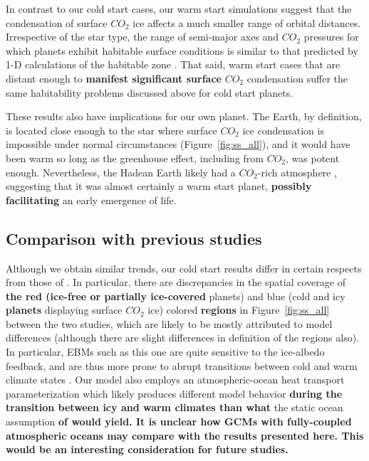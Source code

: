 \documentclass[fleqn,usenatbib]{mnras}
\providecommand{\DIFadd}[1]{{\bf #1}} %
\providecommand{\DIFdel}[1]{} %
\providecommand{\DIFaddbegin}{} %
\providecommand{\DIFaddend}{} %
\providecommand{\DIFdelbegin}{} %
\providecommand{\DIFdelend}{} %
\newcommand{\DIFscaledelfig}{0.5}
\newlength{\DIFdelgraphicswidth} %
\newlength{\DIFdelgraphicsheight} %
\newcommand{\DIFaddincludegraphics}[2][]{{\color{blue}\fbox{\DIFOincludegraphics[#1]{#2}}}} %
\newcommand{\DIFdelincludegraphics}[2][]{%
\sbox{\DIFdelgraphicsbox}{\DIFOincludegraphics[#1]{#2}}%
\settoboxwidth{\DIFdelgraphicswidth}{\DIFdelgraphicsbox} %
\settoboxtotalheight{\DIFdelgraphicsheight}{\DIFdelgraphicsbox} %
\scalebox{\DIFscaledelfig}{%
\parbox[b]{\DIFdelgraphicswidth}{\usebox{\DIFdelgraphicsbox}\\[-\baselineskip] \rule{\DIFdelgraphicswidth}{0em}}\llap{\resizebox{\DIFdelgraphicswidth}{\DIFdelgraphicsheight}{%
\setlength{\unitlength}{\DIFdelgraphicswidth}%
\begin{picture}(1,1)%
\thicklines\linethickness{2pt} %
{\color[rgb]{1,0,0}\put(0,0){\framebox(1,1){}}}%
{\color[rgb]{1,0,0}\put(0,0){\line( 1,1){1}}}%
{\color[rgb]{1,0,0}\put(0,1){\line(1,-1){1}}}%
\end{picture}%
}\hspace*{3pt}}} %
} %
\DeclareRobustCommand{\DIFaddbegin}{\DIFOaddbegin \let\includegraphics\DIFaddincludegraphics} %
\DeclareRobustCommand{\DIFaddend}{\DIFOaddend \let\includegraphics\DIFOincludegraphics} %
\DeclareRobustCommand{\DIFdelbegin}{\DIFOdelbegin \let\includegraphics\DIFdelincludegraphics} %
\DeclareRobustCommand{\DIFdelend}{\DIFOaddend \let\includegraphics\DIFOincludegraphics} %
\begin{document}
\DIFaddend In contrast to our cold start cases, our warm start simulations suggest that the condensation of surface $CO_{\mathrm{2}}$ ice affects a much smaller range of orbital distances. Irrespective of the star type, the range of semi-major axes and $CO_{\mathrm{2}}$ pressures for which planets exhibit habitable surface conditions is similar to that predicted by 1-D calculations of the habitable zone \citep{kasting1993, Ramirez2018}. That said, warm start cases that are distant enough to \DIFdelbegin \DIFdel{exhibit significant }\DIFdelend \DIFaddbegin \DIFadd{manifest significant surface }\DIFaddend $CO_{\mathrm{2}}$ condensation suffer the same habitability problems discussed above for cold start planets. 

These results also have implications for our own planet. The Earth, by definition, is located close enough to the star where surface $CO_{\mathrm{2}}$ ice condensation is impossible under normal circumstances (Figure~\ref{fig:ss_all}), and it would have been warm so long as the greenhouse effect, including from $CO_{\mathrm{2}}$, was potent enough. Nevertheless, the Hadean Earth likely had a $CO_{\mathrm{2}}$-rich atmosphere \citep{kasting2014}, suggesting that it was almost certainly a warm start planet, \DIFdelbegin \DIFdel{which may have possibly helped facilitate }\DIFdelend \DIFaddbegin \DIFadd{possibly facilitating }\DIFaddend an early emergence of life.

\subsection{Comparison with previous \DIFdelbegin \DIFdel{work}\DIFdelend \DIFaddbegin \DIFadd{studies}\DIFaddend }
\DIFaddbegin 

\DIFaddend Although we obtain similar trends, our cold start results differ in certain respects from those of \citet{Turbet2017}. In particular, there are discrepancies in the spatial coverage of \DIFdelbegin \DIFdel{red (warm }\DIFdelend \DIFaddbegin \DIFadd{the red (ice-free or partially ice-covered }\DIFaddend planets) and blue (cold and icy \DIFaddbegin \DIFadd{planets }\DIFaddend displaying surface $CO_{\mathrm{2}}$ ice) colored \DIFdelbegin \DIFdel{areas }\DIFdelend \DIFaddbegin \DIFadd{regions }\DIFaddend in Figure~\ref{fig:ss_all} between the two studies, which are likely to be mostly attributed to model differences (although there are slight differences in definition of the regions also). In particular, EBMs \DIFdelbegin \DIFdel{, }\DIFdelend such as this one \DIFdelbegin \DIFdel{, }\DIFdelend are quite sensitive to the ice-albedo feedback, and are thus more prone to abrupt transitions between cold and warm climate states \citep{RamirezLevi2018}. Our model also employs an atmospheric-ocean heat transport parameterization which likely produces different model behavior \DIFdelbegin \DIFdel{than }\DIFdelend \DIFaddbegin \DIFadd{during the transition between icy and warm climates than what }\DIFaddend the static ocean assumption \DIFdelbegin \DIFdel{made in \citet{Turbet2017} . 
}\DIFdelend \DIFaddbegin \DIFadd{of \citet{Turbet2017} would yield. It is unclear how GCMs with fully-coupled atmospheric oceans may compare with the results presented here. This would be an interesting consideration for future studies. 
}\DIFaddend 
\end{document}
